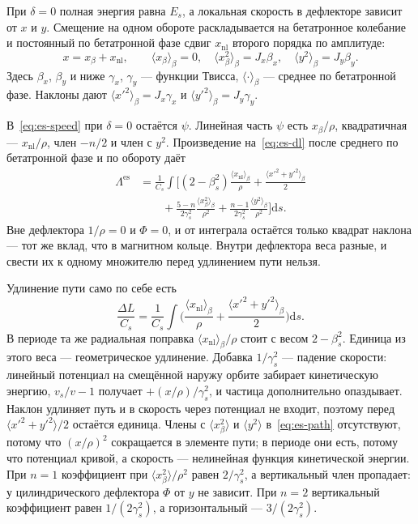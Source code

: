 При $\delta=0$ полная энергия равна $E_s$, а локальная скорость в дефлекторе зависит от $x$ и $y$. Смещение на одном обороте раскладывается на бетатронное колебание и постоянный по бетатронной фазе сдвиг $x_{\mathrm{nl}}$ второго порядка по амплитуде:
\begin{equation}
\label{eq:es-xbeta}
x=x_\beta+x_{\mathrm{nl}},
\qquad
\langle x_\beta\rangle_\beta=0,
\quad
\langle x_\beta^2\rangle_\beta=J_x\beta_x,
\quad
\langle y^2\rangle_\beta=J_y\beta_y.
\end{equation}
Здесь $\beta_x$, $\beta_y$ и ниже $\gamma_x$, $\gamma_y$ --- функции Твисса, $\langle\cdot\rangle_\beta$ --- среднее по бетатронной фазе. Наклоны дают $\langle x'^2\rangle_\beta=J_x\gamma_x$ и $\langle y'^2\rangle_\beta=J_y\gamma_y$.

В~\eqref{eq:es-speed} при $\delta=0$ остаётся $\psi$. Линейная часть $\psi$ есть $x_\beta/\rho$, квадратичная --- $x_{\mathrm{nl}}/\rho$, член $-n/2$ и член с $y^2$. Произведение на~\eqref{eq:es-dl} после среднего по бетатронной фазе и по обороту даёт
\begin{equation}
\label{eq:es-lambda}
\begin{aligned}
\Lambda^{\mathrm{es}}
&=\frac{1}{C_s}\int\Biggl[
(2-\beta_s^2)\frac{\langle x_{\mathrm{nl}}\rangle_\beta}{\rho}
+\frac{\langle x'^2+y'^2\rangle_\beta}{2}
\\
&\qquad
+\frac{5-n}{2\gamma_s^2}\frac{\langle x_\beta^2\rangle_\beta}{\rho^2}
+\frac{n-1}{2\gamma_s^2}\frac{\langle y^2\rangle_\beta}{\rho^2}
\Biggr]\mathrm{d}s.
\end{aligned}
\end{equation}
Вне дефлектора $1/\rho=0$ и $\Phi=0$, и от интеграла остаётся только квадрат наклона --- тот же вклад, что в магнитном кольце. Внутри дефлектора веса разные, и свести их к одному множителю перед удлинением пути нельзя.

Удлинение пути само по себе есть
\begin{equation}
\label{eq:es-path}
\frac{\Delta L}{C_s}
=\frac{1}{C_s}\int\Biggl(
\frac{\langle x_{\mathrm{nl}}\rangle_\beta}{\rho}
+\frac{\langle x'^2+y'^2\rangle_\beta}{2}
\Biggr)\mathrm{d}s.
\end{equation}
В периоде та же радиальная поправка $\langle x_{\mathrm{nl}}\rangle_\beta/\rho$ стоит с весом $2-\beta_s^2$. Единица из этого веса --- геометрическое удлинение. Добавка $1/\gamma_s^2$ --- падение скорости: линейный потенциал на смещённой наружу орбите забирает кинетическую энергию, $v_s/v-1$ получает $+(x/\rho)/\gamma_s^2$, и частица дополнительно опаздывает. Наклон удлиняет путь и в скорость через потенциал не входит, поэтому перед $\langle x'^2+y'^2\rangle/2$ остаётся единица. Члены с $\langle x_\beta^2\rangle$ и $\langle y^2\rangle$ в~\eqref{eq:es-path} отсутствуют, потому что $(x/\rho)^2$ сокращается в элементе пути; в периоде они есть, потому что потенциал кривой, а скорость --- нелинейная функция кинетической энергии. При $n=1$ коэффициент при $\langle x_\beta^2\rangle/\rho^2$ равен $2/\gamma_s^2$, а вертикальный член пропадает: у цилиндрического дефлектора $\Phi$ от $y$ не зависит. При $n=2$ вертикальный коэффициент равен $1/(2\gamma_s^2)$, а горизонтальный --- $3/(2\gamma_s^2)$.

